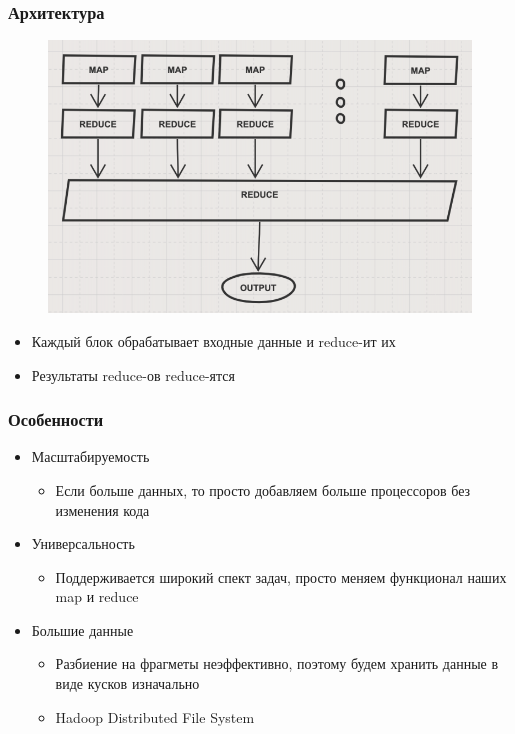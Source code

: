 \documentclass[xetex,mathserif,serif]{beamer}
\begin{document}
\begin{frame}

	\frametitle{Архитектура}
	\begin{figure}[]
		\includegraphics[scale=0.4]{architecture.png}
		\centering
	\end{figure}

	\begin{itemize}
		\item Каждый блок обрабатывает входные данные и reduce-ит их
		\item Результаты reduce-ов reduce-ятся
	\end{itemize}

\end{frame}

\begin{frame}

	\frametitle{Особенности}

	\begin{itemize}
		\item Масштабируемость
		      \begin{itemize}
			      \item Если больше данных, то просто добавляем больше процессоров без изменения кода
		      \end{itemize}
		\item Универсальность
		      \begin{itemize}
			      \item Поддерживается широкий спект задач, просто меняем функционал наших map и reduce
		      \end{itemize}
		\item Большие данные
		      \begin{itemize}
			      \item Разбиение на фрагметы неэффективно, поэтому будем хранить данные в виде кусков изначально
			      \item Hadoop Distributed File System
		      \end{itemize}
	\end{itemize}

\end{frame}
\end{document}
